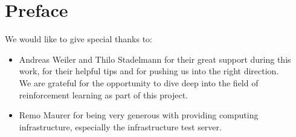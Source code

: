 \chapter*{Preface}\label{preface}
We would like to give special thanks to:
\begin{itemize}
    \item Andreas Weiler and Thilo Stadelmann for their great support during this work, for their helpful tips and for pushing us into the right direction.\\
    We are grateful for the opportunity to dive deep into the field of reinforcement learning as part of this project.
    \item Remo Maurer for being very generous with providing computing infrastructure, especially the infrastructure test server.
\end{itemize}

